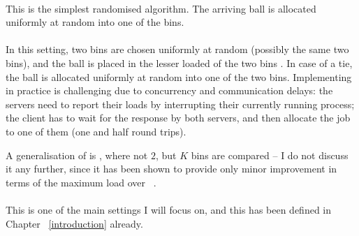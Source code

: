 \paragraph{\OneChoice}

This is the simplest randomised algorithm. The arriving ball is allocated uniformly at random into one of the bins.

\paragraph{\TwoChoice}
In this setting, two bins are chosen uniformly at random (possibly the same two bins), and the ball is placed in the lesser loaded of the two bins . In case of a tie, the ball is allocated uniformly at random into one of the two bins. Implementing \TwoChoice in practice is challenging due to concurrency and communication delays: the servers need to report their loads by interrupting their currently running process; the client has to wait for the response by both servers, and then allocate the job to one of them (one and half round trips).

A generalisation of \TwoChoice is \KChoice, where not $2$, but $K$ bins are compared -- I do not discuss it any further, since it has been shown to provide only minor improvement in terms of the maximum load over \TwoChoice~\cite{azar1999twochoice}.


\paragraph{\TwoThinning}

This is one of the main settings I will focus on, and this has been defined in Chapter ~\ref{introduction} already.


